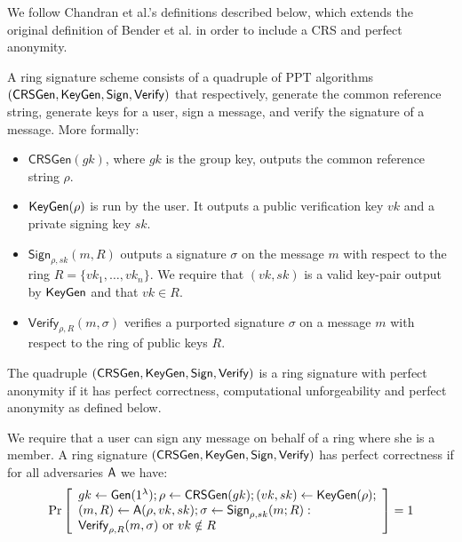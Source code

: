 We follow Chandran et al.'s definitions \cite{ICALP:ChaGroSah07} described below, which extends the original definition of Bender et al. \cite{TCC:BenKatMor06} in order to include a CRS and perfect anonymity.

\begin{definition}
A ring signature scheme consists of a quadruple of
PPT algorithms $(\mathsf{CRSGen}, \mathsf{KeyGen}, \mathsf{Sign}, \mathsf{Verify})$ that respectively, generate the common
reference string, generate keys for a user, sign a message, and verify the signature of a
message. More formally:
\begin{itemize}
\item $\mathsf{CRSGen}(gk)$, where $gk$ is the group key, outputs the common reference
string $\rho$.
\item $\mathsf{KeyGen}(\rho)$ is run by the user. It outputs a public verification key $vk$ and a private
signing key $sk$.
\item $\mathsf{Sign}_{\rho,sk}(m, R)$ outputs a signature $\sigma$ on the message $m$ with respect to the ring
$R = \{vk_1,\ldots,vk_n\}$. We require that $(vk, sk)$ is a valid key-pair output by $\mathsf{KeyGen}$
and that $vk \in R$.
\item $\mathsf{Verify}_{\rho,R}(m, \sigma)$ verifies a purported signature $\sigma$ on a message $m$ with respect to
the ring of public keys $R$.
\end{itemize}
The quadruple $(\mathsf{CRSGen}, \mathsf{KeyGen}, \mathsf{Sign}, \mathsf{Verify})$ is a ring signature with perfect
anonymity if it has perfect correctness, computational unforgeability and perfect
anonymity as defined below.
\end{definition}

\begin{definition}
We require that a user can sign any message on behalf of a ring where she is a member. A ring signature $(\mathsf{CRSGen},\allowbreak \mathsf{KeyGen}, \mathsf{Sign}, \mathsf{Verify})$
has perfect correctness if for all adversaries $\mathsf{A}$ we have:
$$
\Pr\left[\begin{array}{l}
gk\gets\mathsf{Gen}(1^\lambda);\rho\gets\mathsf{CRSGen}(gk);(vk,sk)\gets\mathsf{KeyGen}(\rho);\\
(m,R)\gets\mathsf{A}(\rho,vk,sk);\sigma\gets\mathsf{Sign}_{\rho,sk}(m;R):\\
\mathsf{Verify}_{\rho,R}(m,\sigma)\text{ or }vk\notin R
\end{array}\right]=1
$$
\end{definition}

